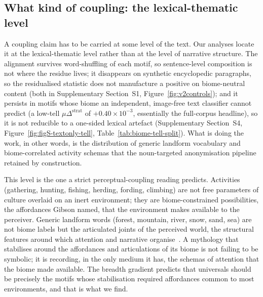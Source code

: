 \documentclass[11pt,a4paper]{article}
\begin{document}
\subsection*{What kind of coupling: the lexical-thematic level}

A coupling claim has to be carried at some level of the text.
Our analyses locate it at the lexical-thematic level rather than
at the level of narrative structure. The alignment survives
word-shuffling of each motif, so sentence-level composition is
not where the residue lives; it disappears on synthetic
encyclopedic paragraphs, so the residualised statistic does not
manufacture a positive on biome-neutral content (both in
Supplementary Section~S1, Figure~\ref{fig:v2controls}); and it
persists in motifs whose biome an independent, image-free text
classifier cannot predict (a low-tell $\mu\Delta^{\text{strat}}$ of
$+0.40\times 10^{-3}$, essentially the full-corpus headline), so it
is not reducible to a one-sided lexical artefact (Supplementary
Section~S4,
Figure~\ref{fig:figS-textonly-tell}, Table~\ref{tab:biome-tell-split}). What is doing the work, in other words, is the
distribution of generic landform vocabulary and biome-correlated
activity schemas that the noun-targeted anonymisation pipeline
retained by construction.

This level is the one a strict perceptual-coupling reading
predicts. Activities (gathering, hunting, fishing, herding,
fording, climbing) are not free parameters of culture overlaid on
an inert environment; they are biome-constrained possibilities,
the affordances Gibson named, that the environment makes
available to the perceiver. Generic landform words (forest,
mountain, river, snow, sand, sea) are not biome labels but the
articulated joints of the perceived world, the structural
features around which attention and narrative
organise~\citep{ingold2000perception,descola2013beyond}. A
mythology that stabilises around the affordances and
articulations of its biome is not failing to be symbolic; it is
recording, in the only medium it has, the schemas of attention
that the biome made available. The breadth gradient predicts that
universals should be precisely the motifs whose stabilisation
required affordances common to most environments, and that is
what we find.
\end{document}

